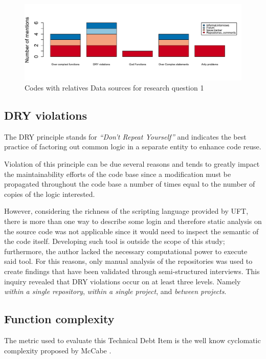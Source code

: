 \begin{figure}[!htbp]
    \centering
    \includegraphics[width=\textwidth,keepaspectratio]{figure/results/rq1/sources.pdf}
    \caption{Codes with relatives Data sources for research question 1}
    \label{fig:rq1_sources}
\end{figure}



\subsection{DRY violations}
    The DRY principle stands for \textit{``Don't Repeat Yourself''} and indicates the best practice of factoring out common logic in a separate entity to enhance code reuse.

    Violation of this principle can be due several reasons and tends to greatly impact the maintainability efforts of the code base since a modification must be propagated throughout the code base a number of times equal to the number of copies of the logic interested.

    However, considering the richness of the scripting language provided by UFT, there is more than one way to describe some login and therefore static analysis on the source code was not applicable since it would need to inspect the semantic of the code itself. Developing such tool is outside the scope of this study; furthermore, the author lacked the necessary computational power to execute said tool. For this reasons, only manual analysis of the repositories was used to create findings that have been validated through semi-structured interviews. This inquiry revealed that DRY violations occur on at least three levels. Namely \textit{within a single repository}, \textit{within a single project}, and \textit{between projects}.
    

\subsection{Function complexity}
    The metric used to evaluate this Technical Debt Item is the well know cyclomatic complexity proposed by McCabe \cite{cyclomatic_complexity}.

